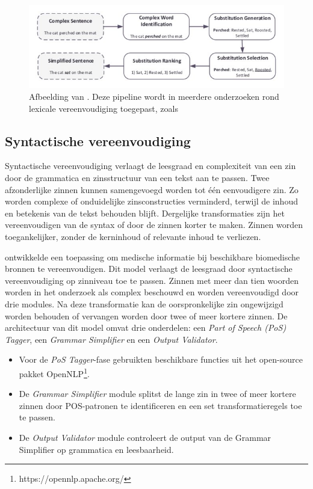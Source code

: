 \begin{figure}[H]
	\includegraphics{img/lexical-simplification-pipeline.png}
	\caption{Afbeelding van \textcite{Althunayyan2021}. Deze pipeline wordt in meerdere onderzoeken rond lexicale vereenvoudiging toegepast, zoals \textcite{Paetzold2016, Bingel2018, Bulte2018}}
\end{figure}


\subsection{Syntactische vereenvoudiging}

Syntactische vereenvoudiging verlaagt de leesgraad en complexiteit van een zin door de grammatica en zinsstructuur van een tekst aan te passen. Twee afzonderlijke zinnen kunnen samengevoegd worden tot één eenvoudigere zin. Zo worden complexe of onduidelijke zinsconstructies verminderd, terwijl de inhoud en betekenis van de tekst behouden blijft. Dergelijke transformaties zijn het vereenvoudigen van de syntax of door de zinnen korter te maken. Zinnen worden toegankelijker, zonder de kerninhoud of relevante inhoud te verliezen.

\textcite{Kandula2010} ontwikkelde een toepassing om medische informatie bij beschikbare biomedische bronnen te vereenvoudigen. Dit model verlaagt de leesgraad door syntactische vereenvoudiging op zinniveau toe te passen. Zinnen met meer dan tien woorden worden in het onderzoek als complex beschouwd en worden vereenvoudigd door drie modules. Na deze transformatie kan de oorspronkelijke zin ongewijzigd worden behouden of vervangen worden door twee of meer kortere zinnen. De architectuur van dit model omvat drie onderdelen: een \textit{Part of Speech (PoS) Tagger}, een \textit{Grammar Simplifier} en een \textit{Output Validator}. 

\begin{itemize}
	\item Voor de \textit{PoS Tagger}-fase gebruikten \textcite{Kandula2010} beschikbare functies uit het open-source pakket OpenNLP\footnote{https://opennlp.apache.org/}.
	\item De \textit{Grammar Simplifier} module splitst de lange zin in twee of meer kortere zinnen door POS-patronen te identificeren en een set transformatieregels toe te passen.
	\item De \textit{Output Validator} module controleert de output van de Grammar Simplifier op grammatica en leesbaarheid.
\end{itemize}  

